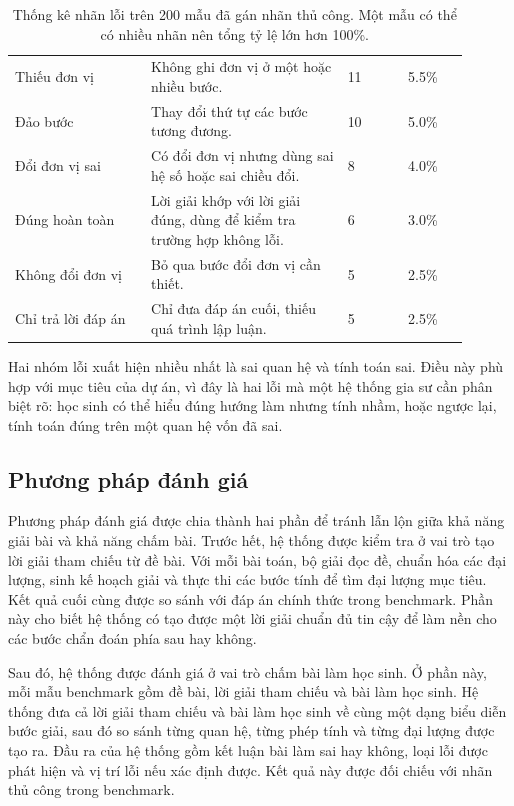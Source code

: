 \documentclass[12pt,a4paper]{article}
\begin{document}
\begin{table}[H]
\begin{tabular}{p{0.27\linewidth} p{0.39\linewidth} p{0.12\linewidth} p{0.12\linewidth}}
        Thiếu đơn vị & Không ghi đơn vị ở một hoặc nhiều bước. & 11 & 5.5\% \\
        Đảo bước & Thay đổi thứ tự các bước tương đương. & 10 & 5.0\% \\
        Đổi đơn vị sai & Có đổi đơn vị nhưng dùng sai hệ số hoặc sai chiều đổi. & 8 & 4.0\% \\
        Đúng hoàn toàn & Lời giải khớp với lời giải đúng, dùng để kiểm tra trường hợp không lỗi. & 6 & 3.0\% \\
        Không đổi đơn vị & Bỏ qua bước đổi đơn vị cần thiết. & 5 & 2.5\% \\
        Chỉ trả lời đáp án & Chỉ đưa đáp án cuối, thiếu quá trình lập luận. & 5 & 2.5\% \\
        \bottomrule
    \end{tabular}
    \caption{Thống kê nhãn lỗi trên 200 mẫu đã gán nhãn thủ công. Một mẫu có thể có nhiều nhãn nên tổng tỷ lệ lớn hơn 100\%.}
\end{table}

Hai nhóm lỗi xuất hiện nhiều nhất là sai quan hệ và tính toán sai. Điều này phù
hợp với mục tiêu của dự án, vì đây là hai lỗi mà một hệ thống gia sư cần phân
biệt rõ: học sinh có thể hiểu đúng hướng làm nhưng tính nhầm, hoặc ngược lại,
tính toán đúng trên một quan hệ vốn đã sai.

\subsection{Phương pháp đánh giá}

Phương pháp đánh giá được chia thành hai phần để tránh lẫn lộn giữa khả năng
giải bài và khả năng chấm bài. Trước hết, hệ thống được kiểm tra ở vai trò tạo
lời giải tham chiếu từ đề bài. Với mỗi bài toán, bộ giải đọc đề, chuẩn hóa các
đại lượng, sinh kế hoạch giải và thực thi các bước tính để tìm đại lượng mục
tiêu. Kết quả cuối cùng được so sánh với đáp án chính thức trong benchmark. Phần
này cho biết hệ thống có tạo được một lời giải chuẩn đủ tin cậy để làm nền cho
các bước chẩn đoán phía sau hay không.

Sau đó, hệ thống được đánh giá ở vai trò chấm bài làm học sinh. Ở phần này, mỗi
mẫu benchmark gồm đề bài, lời giải tham chiếu và bài làm học sinh. Hệ thống đưa
cả lời giải tham chiếu và bài làm học sinh về cùng một dạng biểu diễn bước giải,
sau đó so sánh từng quan hệ, từng phép tính và từng đại lượng được tạo ra. Đầu
ra của hệ thống gồm kết luận bài làm sai hay không, loại lỗi được phát hiện và
vị trí lỗi nếu xác định được. Kết quả này được đối chiếu với nhãn thủ công trong
benchmark.
\end{document}
